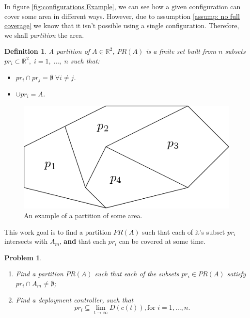\documentclass{iacas}
\newcommand{\rsqr}{\mathbb{R}^2}
\newtheorem{definition}{Definition}
\newtheorem{problem}{Problem}
\begin{document}

In figure \ref{fig:configurations Example}, we can see how a given configuration can cover some area in different ways. However, due to assumption \ref{assump: no full coverage} we know that it isn't possible using a single configuration. Therefore, we shall \emph{partition} the area.

\begin{definition}
A \emph{partition} of $A \in \rsqr$, $PR(A)$ is a finite set built from $n$ subsets $pr_i \subset \rsqr,\; i=1,\; \ldots,\; n$ such that:
\begin{itemize}
\item $pr_i \cap pr_j = \emptyset \; \forall i \neq j$.
\item $\cup pr_i = A$.
\end{itemize}
\end{definition}

\begin{figure}[!ht]
\centering
\includegraphics[scale=0.4]{figures/problem-def/partitioning.png}
\caption{An example of a partition of some area.}
\end{figure}

This work goal is to find a partition $PR(A)$ such that each of it's subset $pr_i$ intersects with $A_m$, \textbf{and} that each $pr_i$ can be covered at some time.

\begin{problem} \label{GeneralProblem}

\begin{enumerate}
\item Find a partition $PR(A)$ such that each of the subsets $pr_i \in PR(A)$ satisfy $pr_i \cap A_m \neq \emptyset$;
\item Find a deployment controller, such that $$ pr_i \subseteq \lim_{t\rightarrow \infty}D(c(t)),\text{for }i=1,\ldots,n.$$
\end{enumerate}
\end{problem}
\end{document}
